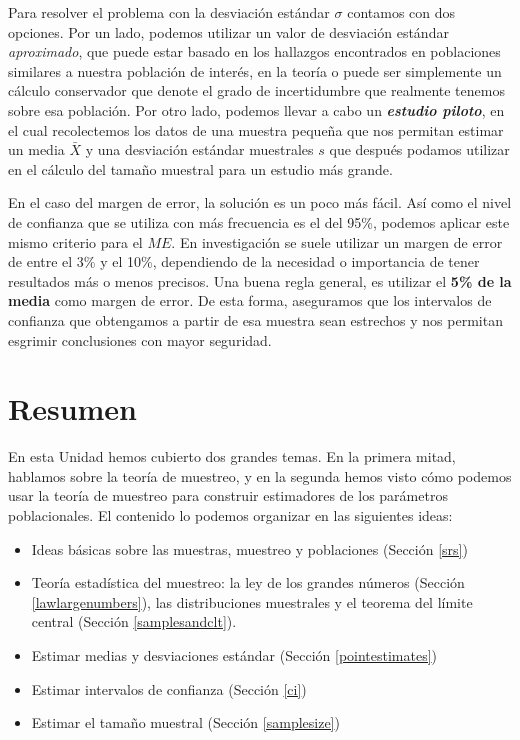 \documentclass[spanish,]{book}
\providecommand{\tightlist}{%
  \setlength{\itemsep}{0pt}\setlength{\parskip}{0pt}}
\begin{document}
Para resolver el problema con la desviación estándar \(\sigma\) contamos
con dos opciones. Por un lado, podemos utilizar un valor de desviación
estándar \emph{aproximado}, que puede estar basado en los hallazgos
encontrados en poblaciones similares a nuestra población de interés, en
la teoría o puede ser simplemente un cálculo conservador que denote el
grado de incertidumbre que realmente tenemos sobre esa población. Por
otro lado, podemos llevar a cabo un \textbf{\emph{estudio piloto}}, en
el cual recolectemos los datos de una muestra pequeña que nos permitan
estimar un media \(\bar{X}\) y una desviación estándar muestrales \(s\)
que después podamos utilizar en el cálculo del tamaño muestral para un
estudio más grande.

En el caso del margen de error, la solución es un poco más fácil. Así
como el nivel de confianza que se utiliza con más frecuencia es el del
95\%, podemos aplicar este mismo criterio para el \(ME\). En
investigación se suele utilizar un margen de error de entre el 3\% y el
10\%, dependiendo de la necesidad o importancia de tener resultados más
o menos precisos. Una buena regla general, es utilizar el \textbf{5\% de
la media} como margen de error. De esta forma, aseguramos que los
intervalos de confianza que obtengamos a partir de esa muestra sean
estrechos y nos permitan esgrimir conclusiones con mayor seguridad.

\section{Resumen}\label{resumen-1}

En esta Unidad hemos cubierto dos grandes temas. En la primera mitad,
hablamos sobre la teoría de muestreo, y en la segunda hemos visto cómo
podemos usar la teoría de muestreo para construir estimadores de los
parámetros poblacionales. El contenido lo podemos organizar en las
siguientes ideas:

\begin{itemize}
\tightlist
\item
  Ideas básicas sobre las muestras, muestreo y poblaciones (Sección
  \ref{srs})
\item
  Teoría estadística del muestreo: la ley de los grandes números
  (Sección \ref{lawlargenumbers}), las distribuciones muestrales y el
  teorema del límite central (Sección \ref{samplesandclt}).
\item
  Estimar medias y desviaciones estándar (Sección \ref{pointestimates})
\item
  Estimar intervalos de confianza (Sección \ref{ci})
\item
  Estimar el tamaño muestral (Sección \ref{samplesize})
\end{itemize}


\end{document}
